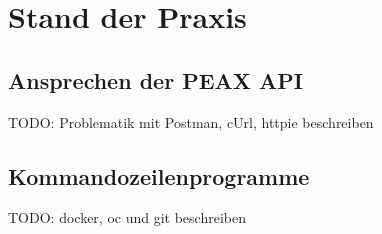\section{Stand der Praxis}

\subsection{Ansprechen der PEAX API}

TODO: Problematik mit Postman, cUrl, httpie beschreiben

\subsection{Kommandozeilenprogramme}

TODO: docker, oc und git beschreiben
